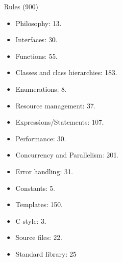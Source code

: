 \begin{frame}[t,shrink]{Rules (900)}
\begin{itemize}
  \item Philosophy: 13.
  \item Interfaces: 30.
  \item Functions: 55.
  \item Classes and class hierarchies: 183.
  \item Enumerations: 8.
  \item Resource management: 37.
  \item Expressions/Statements: 107.
  \item Performance: 30.
  \item Concurrency and Parallelism: 201.
  \item Error handling: 31.
  \item Constants: 5.
  \item Templates: 150.
  \item C-style: 3.
  \item Source files: 22.
  \item Standard library: 25
\end{itemize}
\end{frame}
